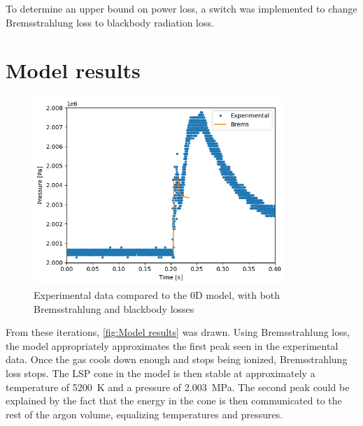         To determine an upper bound on power loss, a switch was implemented to change Bremsstrahlung loss to blackbody radiation loss.

    \section{Model results}

        \begin{figure}[!ht]
            \centering
            \includegraphics[width=0.85\textwidth]{assets/2 models/Brems vs exp graph.png}
            \caption{Experimental data compared to the 0D model, with both Bremsstrahlung and blackbody losses}
            \label{fig:Model results}
        \end{figure}

         From these iterations, \autoref{fig:Model results} was drawn. Using Bremsstrahlung loss, the model appropriately approximates the first peak seen in the experimental data. Once the gas cools down enough and stops being ionized, Bremsstrahlung loss stops. The LSP cone in the model is then stable at approximately a temperature of \qty{5200}{K} and a pressure of \qty{2.003}{MPa}. The second peak could be explained by the fact that the energy in the cone is then communicated to the rest of the argon volume, equalizing temperatures and pressures.